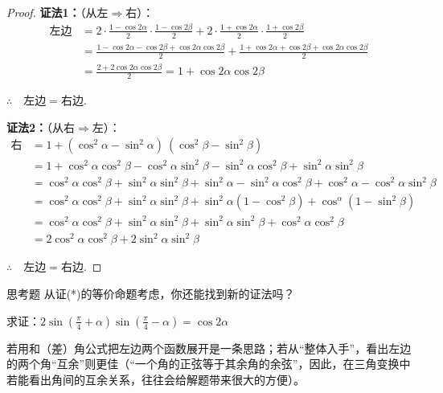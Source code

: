 \begin{proof}
\textbf{证法1：}（从左$\Longrightarrow$右）：
\[\begin{split}
    \text{左边}&= 2\cdot\frac {1- \cos 2\alpha }2\cdot\frac {1- \cos 2\beta }2+ 2\cdot\frac {1+ \cos 2\alpha }2\cdot \frac {1+ \cos 2\beta }2\\
&=\frac{1-\cos2\alpha-\cos2\beta+\cos2\alpha\cos2\beta}{2}+\frac{1+\cos2\alpha+\cos2\beta+\cos2\alpha\cos2\beta}{2}\\
&= \frac {2+ 2\cos 2\alpha \cos2\beta }2= 1+ \cos 2\alpha\cos 2\beta
\end{split}\]

$\therefore \quad \text{左边}=\text{右边}$.

\textbf{证法2：}（从右$\Longrightarrow$左）：
\[\begin{split}
    \text{右边}&=1+(\cos^{2}\alpha-\sin^{2}\alpha)\:(\cos^{2}\beta-\sin^{2}\beta)\\
    &=1+\cos^{2}\alpha\cos^{2}\beta-\cos^{2}\alpha\sin^{2}\beta-\sin^{2}\alpha\cos^{2}\beta+\sin^{2}\alpha\sin^{2}\beta\\
    &=\cos^{2}\alpha\cos^{2}\beta+\sin^{2}\alpha\sin^{2}\beta+\sin^{2}\alpha-\sin^{2}\alpha\cos^{2}\beta+\cos^{2}\alpha-\cos^{2}\alpha\sin^{2}\beta\\
    &=\cos^{2}\alpha\cos^{2}\beta+\sin^{2}\alpha\sin^{2}\beta+\sin^{2}\alpha\left(1-\cos^{2}\beta\right)+\cos^\alpha(1-\sin^2\beta)\\
&=\cos^2\alpha\cos^2\beta+\sin^2\alpha\sin^2\beta+\sin^2\alpha\sin^2\beta+\cos^2\alpha\cos^2\beta\\
&=2\cos^2\alpha\cos^2\beta+2\sin^2\alpha\sin^2\beta
\end{split}\]

$\therefore \quad \text{左边}=\text{右边}$.
\end{proof}
    
\begin{thm}{思考题}
从证(*)的等价命题考虑，你还能找到新的证法吗？
\end{thm}


\begin{example}
    求证：$2\sin\left(\frac{\pi}{4}+\alpha\right)\sin\left(\frac{\pi}{4}-\alpha\right)=\cos2\alpha$
\end{example}

\begin{analyze}
若用和（差）角公式把左边两个函数展开是一条思路；若从“整体入手”，看出左边的两个角“互余”则更佳（“一个角的正弦等于其余角的余弦”，因此，在三角变换中若能看出角间的互余关系，往往会给解题带来很大的方便）。
\end{analyze}


